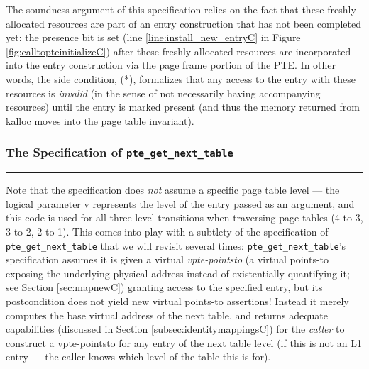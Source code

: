 The soundness argument of this specification relies on the fact that these freshly allocated resources are part
of an entry construction that has not been completed yet: the presence bit is set (line \ref{line:install_new_entryC} in Figure \ref{fig:calltopteinitializeC}) after these freshly allocated resources are incorporated into the
entry construction via the page frame portion of the PTE. In other words, the side condition, (*),
 formalizes that any access to the entry with these resources is \textit{invalid} (in the sense of not necessarily
having accompanying resources) until the entry is marked present (and thus the memory returned from \textsf{kalloc}
moves into the page table invariant).


\subsubsection{The Specification of \lstinline|pte_get_next_table|}
\hrule

Note that the specification does \emph{not} assume a specific page table level --- the logical parameter \textsf{v} represents the level
of the entry passed as an argument, and this code
is used for all three level transitions when traversing page tables (4 to 3, 3 to 2, 2 to 1).
This comes into play with a subtlety of the specification of \lstinline|pte_get_next_table| that we will
revisit several times: \lstinline|pte_get_next_table|'s specification
assumes it is given a virtual \emph{vpte-pointsto}
(a virtual points-to exposing the underlying physical address instead of existentially quantifying it;
 see Section \ref{sec:mapnewC}) granting access to the specified entry,
but its postcondition does not yield new virtual points-to assertions!
Instead it merely computes the base virtual address of the next table, and returns adequate capabilities (discussed in Section \ref{subsec:identitymappingsC})
for the \emph{caller} to construct a vpte-pointsto for any entry of the next table level (if this is not an L1 entry ---
the caller knows which level of the table this is for).



